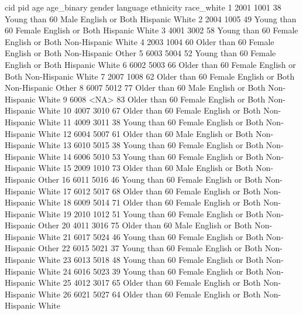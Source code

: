 \documentclass[
  letterpaper,
  DIV=11,
  numbers=noendperiod]{scrreprt}
\newenvironment{Shaded}{\begin{snugshade}}{\end{snugshade}}
\newcommand{\NormalTok}[1]{\textcolor[rgb]{0.00,0.23,0.31}{#1}}
\begin{document}
\begin{Shaded}
\begin{Highlighting}[]
\NormalTok{     cid  pid age    age\_binary gender        language    ethnicity race\_white}
\NormalTok{1   2001 1001  38 Young than 60   Male English or Both     Hispanic      White}
\NormalTok{2   2004 1005  49 Young than 60 Female English or Both     Hispanic      White}
\NormalTok{3   4001 3002  58 Young than 60 Female English or Both Non{-}Hispanic      White}
\NormalTok{4   2003 1004  60 Older than 60 Female English or Both Non{-}Hispanic      Other}
\NormalTok{5   6003 5004  52 Young than 60 Female English or Both     Hispanic      White}
\NormalTok{6   6002 5003  66 Older than 60 Female English or Both Non{-}Hispanic      White}
\NormalTok{7   2007 1008  62 Older than 60 Female English or Both Non{-}Hispanic      Other}
\NormalTok{8   6007 5012  77 Older than 60   Male English or Both Non{-}Hispanic      White}
\NormalTok{9   6008 \textless{}NA\textgreater{}  83 Older than 60 Female English or Both Non{-}Hispanic      White}
\NormalTok{10  4007 3010  67 Older than 60 Female English or Both Non{-}Hispanic      White}
\NormalTok{11  4009 3011  38 Young than 60 Female English or Both Non{-}Hispanic      White}
\NormalTok{12  6004 5007  61 Older than 60   Male English or Both Non{-}Hispanic      White}
\NormalTok{13  6010 5015  38 Young than 60 Female English or Both Non{-}Hispanic      White}
\NormalTok{14  6006 5010  53 Young than 60 Female English or Both Non{-}Hispanic      White}
\NormalTok{15  2009 1010  73 Older than 60   Male English or Both Non{-}Hispanic      Other}
\NormalTok{16  6011 5016  46 Young than 60 Female English or Both Non{-}Hispanic      White}
\NormalTok{17  6012 5017  68 Older than 60 Female English or Both Non{-}Hispanic      White}
\NormalTok{18  6009 5014  71 Older than 60 Female English or Both Non{-}Hispanic      White}
\NormalTok{19  2010 1012  51 Young than 60 Female English or Both Non{-}Hispanic      Other}
\NormalTok{20  4011 3016  75 Older than 60   Male English or Both Non{-}Hispanic      White}
\NormalTok{21  6017 5024  46 Young than 60 Female English or Both Non{-}Hispanic      Other}
\NormalTok{22  6015 5021  37 Young than 60 Female English or Both Non{-}Hispanic      White}
\NormalTok{23  6013 5018  48 Young than 60 Female English or Both Non{-}Hispanic      White}
\NormalTok{24  6016 5023  39 Young than 60 Female English or Both Non{-}Hispanic      White}
\NormalTok{25  4012 3017  65 Older than 60 Female English or Both Non{-}Hispanic      White}
\NormalTok{26  6021 5027  64 Older than 60 Female English or Both Non{-}Hispanic      White}

\end{Highlighting}
\end{Shaded}
\end{document}

